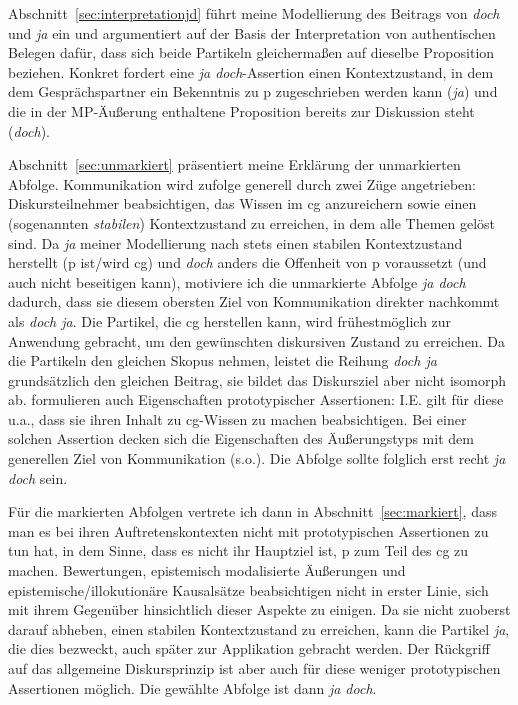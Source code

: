 Abschnitt~\ref{sec:interpretationjd} führt meine Modellierung des Beitrags von \textit{doch} und \textit{ja} ein und argumentiert auf der Basis der Interpretation von authentischen Belegen dafür, dass sich beide Partikeln gleichermaßen auf dieselbe Proposition beziehen. Konkret fordert eine \textit{ja doch}-Assertion einen Kontextzustand, in dem dem Gesprächspartner ein Bekenntnis zu p zugeschrieben werden kann (\textit{ja}) und die in der MP-Äußerung enthaltene Proposition bereits zur Diskussion steht (\textit{doch}). 

Abschnitt~\ref{sec:unmarkiert} präsentiert meine Erklärung der unmarkierten Abfolge. Kommunikation wird \citet{Farkas2010} zufolge generell durch zwei Züge angetrieben: Diskursteilnehmer beabsichtigen, das Wissen im cg anzureichern sowie einen (sogenannten \textit{stabilen}) Kontextzustand zu erreichen, in dem alle Themen gelöst sind. Da \textit{ja} meiner Modellierung nach stets einen stabilen Kontextzustand herstellt (p ist/wird cg) und \textit{doch} anders die Offenheit von p voraussetzt (und auch nicht beseitigen kann), motiviere ich die unmarkierte Abfolge \textit{ja doch} dadurch, dass sie diesem obersten Ziel von Kommunikation direkter nachkommt als \textit{doch ja}. Die Partikel, die cg herstellen kann, wird frühestmöglich zur Anwendung gebracht, um den gewünschten diskursiven Zustand zu erreichen. Da die Partikeln den gleichen Skopus  nehmen, leistet die Reihung \textit{doch ja} grundsätzlich den gleichen Beitrag, sie bildet das Diskursziel aber nicht isomorph  ab. \citet{Farkas2010} formulieren auch Eigenschaften  prototypischer Assertionen: I.E. gilt für diese u.a., dass sie ihren Inhalt zu cg-Wissen zu machen beabsichtigen. Bei einer solchen Assertion decken sich die Eigenschaften des Äußerungstyps mit dem generellen Ziel von Kommunikation (s.o.). Die Abfolge sollte folglich erst recht \textit{ja doch} sein.  

Für die markierten Abfolgen vertrete ich dann in Abschnitt~\ref{sec:markiert}, dass man es bei ihren Auftretenskontexten nicht mit prototypischen Assertionen zu tun hat, in dem Sinne, dass es nicht ihr Hauptziel ist, p zum Teil des cg zu machen. Be\-wertungen, epistemisch modalisierte Äußerungen und epistemische/illokutionäre Kausalsätze beabsichtigen nicht in erster Linie, sich mit ihrem Gegenüber hinsichtlich dieser Aspekte zu einigen. Da sie nicht zuoberst darauf abheben, einen stabilen Kontextzustand zu erreichen, kann die Partikel \textit{ja}, die dies bezweckt, auch später zur Applikation gebracht werden. Der Rückgriff auf das allgemeine Diskursprinzip ist aber auch für diese weniger prototypischen Assertionen mög\-lich. Die gewählte Abfolge ist dann \textit{ja doch}. 

